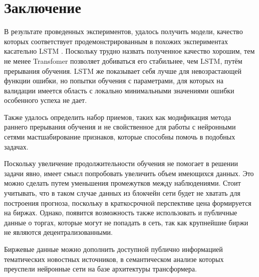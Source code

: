 \documentclass[diploma]{nanolab2015}
\begin{document}
\chapter{Заключение}
В результате проведенных экспериментов, удалось получить модели, качество которых соответствует продемонстрированным в похожих экспериментах касательно LSTM \cite{book11}. Поскольку трудно назвать полученное качество хорошим, тем не менее Transfomer позволяет добиваться его стабильнее, чем LSTM, путём прерывания обучения. LSTM же показывает себя лучше для невозрастающей функции ошибки, но попытки обучения с параметрами, для которых на валидации имеется область с локально минимальными значениями ошибки особенного успеха не дает.

Также удалось определить набор приемов, таких как модификация метода раннего прерывания обучения и не свойственное для работы с нейронными сетями мастшабирование признаков, которые способны помочь в подобных задачах.

Поскольку увеличение продолжительности обучения не помогает в решении задачи явно, имеет смысл попробовать увеличить объем имеющихся данных. Это можно сделать путем уменьшения промежутков между наблюдениями. Стоит учитывать, что в таком случае данных из блокчейн сети будет не хватать для построения прогноза, поскольку в краткосрочной перспективе цена формируется на биржах. Однако, появится возможность также использовать и публичные данные о торгах, которые могут не попадать в сеть, так как крупнейшие биржи не являются децентрализованными.

Биржевые данные можно дополнить доступной публично информацией тематических новостных источников, в семантическом анализе которых преуспели нейронные сети на базе архитектуры трансформера.
\end{document}
